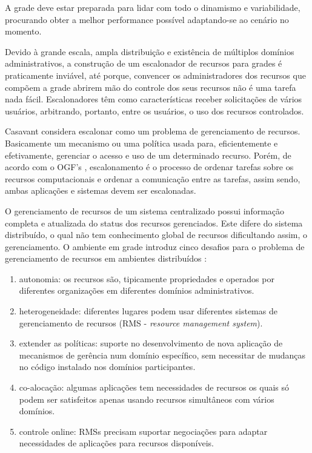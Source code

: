 A grade deve estar preparada para lidar com todo o dinamismo e variabilidade, procurando obter a melhor performance possível adaptando-se ao cenário no momento.

Devido à grande escala, ampla distribuição e existência de múltiplos domínios administrativos, a construção de um escalonador de recursos para grades é praticamente inviável, até porque, convencer os administradores dos recursos que compõem a grade abrirem mão do controle dos seus recursos não é uma tarefa nada fácil. Escalonadores têm como características receber solicitações de vários usuários, arbitrando, portanto, entre os usuários, o uso dos recursos controlados.  

Casavant \cite{Thomas1996} considera escalonar como um problema de gerenciamento de recursos. Basicamente um mecanismo ou uma política usada para, eficientemente e efetivamente, gerenciar o acesso e uso de um determinado recurso. Porém, de acordo com o OGF's \cite{M.2002}, escalonamento é o processo de ordenar tarefas sobre os recursos computacionais e ordenar a comunicação entre as tarefas, assim sendo, ambas aplicações e sistemas devem ser escalonadas. 

O gerenciamento de recursos de um sistema centralizado possui informação completa e atualizada do status dos recursos gerenciados. Este difere do sistema distribuído, o qual não tem conhecimento global de recursos dificultando assim, o gerenciamento. O ambiente em grade introduz cinco desafios para o problema de gerenciamento de recursos em ambientes distribuídos \cite{Karl1998}:

\begin{enumerate}
\item autonomia: os recursos são, tipicamente propriedades e operados por diferentes organizações em diferentes domínios administrativos.
\item heterogeneidade: diferentes lugares podem usar diferentes sistemas de gerenciamento de recursos (RMS - \emph{resource management system}).
\item extender as políticas: suporte no desenvolvimento de nova aplicação de mecanismos de gerência num domínio específico, sem necessitar de mudanças no código instalado nos domínios participantes.
\item co-alocação: algumas aplicações tem necessidades de recursos os quais só podem ser satisfeitos apenas usando recursos simultâneos com vários domínios.
\item controle online: RMSs precisam suportar negociações para adaptar necessidades de aplicações para recursos disponíveis.
\end{enumerate}

